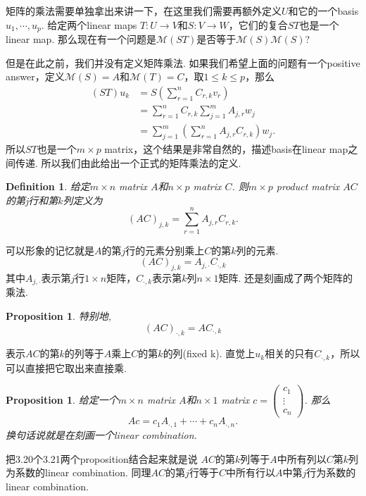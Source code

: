 \documentclass{article}
\newtheorem{proposition}[theorem]{Proposition}
\newtheorem{definition}[theorem]{Definition}
\newcommand*{\xfunc}[4]{{#2}\colon{#3}{#1}{#4}}
\newcommand*{\func}[3]{\xfunc{\to}{#1}{#2}{#3}}
\begin{document}
矩阵的乘法需要单独拿出来讲一下，在这里我们需要再额外定义$U$和它的一个basis $u_1,\cdots,u_p$. 给定两个linear maps $\func{T}{U}{V}$和$\func{S}{V}{W}$，它们的复合$ST$也是一个linear map. {\color{red} 那么现在有一个问题是$\mathcal{M}(ST)$是否等于$\mathcal{M}(S)\mathcal{M}(S)$}?

但是在此之前，我们并没有定义矩阵乘法. 如果我们希望上面的问题有一个positive answer，定义$\mathcal{M}(S) = A$和$\mathcal{M}(T) = C$，取$1 \leq k \leq p $，那么
$$
\begin{aligned}
(ST)u_k &= S(\sum\limits_{r=1}^{n}C_{r,k}v_r) \\
		&= \sum\limits_{r=1}^{n}C_{r,k}\sum\limits_{j=1}^{m}A_{j,r}w_j\\
		&= \sum\limits_{j=1}^{m}(\sum\limits_{r=1}^{n}A_{j,r}C_{r,k})w_j.
\end{aligned}
$$
所以$ST$也是一个$m \times p$ matrix，这个结果是非常自然的，描述basis在linear map之间传递. 所以我们由此给出一个正式的矩阵乘法的定义.

\begin{definition}
\rm 给定$ m \times n$ matrix $A$和$n \times p$ matrix $C$. 则$m \times p$ product matrix $AC$的第j行和第$k$列定义为
$$
(AC)_{j,k} =  \sum\limits_{r=1}^{n}A_{j,r}C_{r,k} .
$$
\end{definition}

{\color{blue} 可以形象的记忆就是$A$的第$j$行的元素分别乘上$C$的第$k$列的元素}.
$$
(AC)_{j,k}=A_{j,\cdot}C_{\cdot,k}
$$
其中$A_{j,\cdot}$表示第$j$行$1 \times n$矩阵，$C_{\cdot,k}$表示第$k$列$n \times 1$矩阵. 还是刻画成了两个矩阵的乘法.

\begin{proposition}
特别地,
$$
(AC)_{\cdot,k}=AC_{\cdot,k}
$$
\end{proposition}
表示$AC$的第$k$的列等于$A$乘上$C$的第$k$的列(fixed k). {\color{red} 直觉上$u_k$相关的只有$C_{\cdot,k}$，所以可以直接把它取出来直接乘}.

\begin{proposition}
\rm 给定一个$m \times n$ matrix $A$和$n \times 1$ matrix $c = \begin{pmatrix} c_1 \\ \vdots \\ c_n \end{pmatrix}$. 那么
$$
Ac = c_1A_{\cdot,1} + \cdots + c_nA_{\cdot,n}.
$$
换句话说就是在刻画一个linear combination.
\end{proposition}

把3.20个3.21两个proposition结合起来就是说{\color{red} $AC$的第$k$列等于$A$中所有列以$C$第$k$列为系数的linear combination}. {\color{blue}同理$AC$的第$j$行等于$C$中所有行以$A$中第$j$行为系数的linear combination}.
\end{document}
